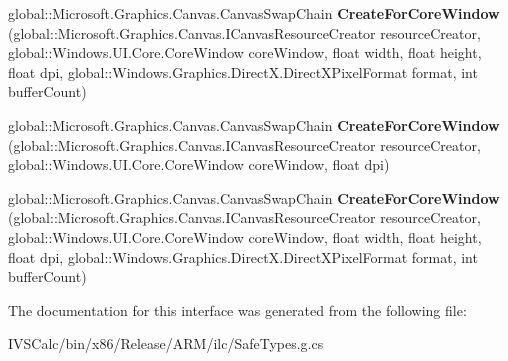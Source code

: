 \begin{DoxyCompactItemize}
global\+::\+Microsoft.\+Graphics.\+Canvas.\+Canvas\+Swap\+Chain {\bfseries Create\+For\+Core\+Window} (global\+::\+Microsoft.\+Graphics.\+Canvas.\+I\+Canvas\+Resource\+Creator resource\+Creator, global\+::\+Windows.\+U\+I.\+Core.\+Core\+Window core\+Window, float width, float height, float dpi, global\+::\+Windows.\+Graphics.\+Direct\+X.\+Direct\+X\+Pixel\+Format format, int buffer\+Count)
\item 
\mbox{\label{interface_microsoft_1_1_graphics_1_1_canvas_1_1_i_canvas_swap_chain_statics_a6a0db7b5454320836bd36df271776cea}} 
global\+::\+Microsoft.\+Graphics.\+Canvas.\+Canvas\+Swap\+Chain {\bfseries Create\+For\+Core\+Window} (global\+::\+Microsoft.\+Graphics.\+Canvas.\+I\+Canvas\+Resource\+Creator resource\+Creator, global\+::\+Windows.\+U\+I.\+Core.\+Core\+Window core\+Window, float dpi)
\item 
\mbox{\label{interface_microsoft_1_1_graphics_1_1_canvas_1_1_i_canvas_swap_chain_statics_afb12532100a3740af7bfec62008c5172}} 
global\+::\+Microsoft.\+Graphics.\+Canvas.\+Canvas\+Swap\+Chain {\bfseries Create\+For\+Core\+Window} (global\+::\+Microsoft.\+Graphics.\+Canvas.\+I\+Canvas\+Resource\+Creator resource\+Creator, global\+::\+Windows.\+U\+I.\+Core.\+Core\+Window core\+Window, float width, float height, float dpi, global\+::\+Windows.\+Graphics.\+Direct\+X.\+Direct\+X\+Pixel\+Format format, int buffer\+Count)
\end{DoxyCompactItemize}


The documentation for this interface was generated from the following file\+:\begin{DoxyCompactItemize}
\item 
I\+V\+S\+Calc/bin/x86/\+Release/\+A\+R\+M/ilc/Safe\+Types.\+g.\+cs\end{DoxyCompactItemize}
